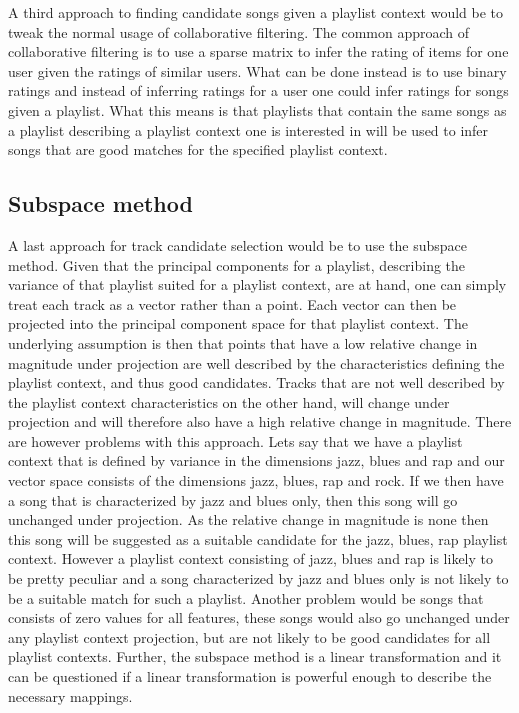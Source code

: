 \documentclass[a4paper,11pt]{kth-mag}
\begin{document}
A third approach to finding candidate songs given a playlist context would be to tweak the normal usage of collaborative filtering. The common approach of collaborative filtering is to use a sparse matrix to infer the rating of items for one user given the ratings of similar users. What can be done instead is to use binary ratings and instead of inferring ratings for a user one could infer ratings for songs given a playlist. What this means is that playlists that contain the same songs as a playlist describing a playlist context one is interested in will be used to infer songs that are good matches for the specified playlist context. 

\subsection{Subspace method}
A last approach for track candidate selection would be to use the subspace method. Given that the principal components for a playlist, describing the variance of that playlist suited for a playlist context, are at hand, one can simply treat each track as a vector rather than a point. Each vector can then be projected into the principal component space for that playlist context. The underlying assumption is then that points that have a low relative change in magnitude under projection are well described by the characteristics defining the playlist context, and thus good candidates. Tracks that are not well described by the playlist context characteristics on the other hand, will change under projection and will therefore also have a high relative change in magnitude. There are however problems with this approach. Lets say that we have a playlist context that is defined by variance in the dimensions jazz, blues and rap and our vector space consists of the dimensions jazz, blues, rap and rock. If we then have a song that is characterized by jazz and blues only, then this song will go unchanged under projection. As the relative change in magnitude is none then this song will be suggested as a suitable candidate for the jazz, blues, rap playlist context. However a playlist context consisting of jazz, blues and rap is likely to be pretty peculiar and a song characterized by jazz and blues only is not likely to be a suitable match for such a playlist. Another problem would be songs that consists of zero values for all features, these songs would also go unchanged under any playlist context projection, but are not likely to be good candidates for all playlist contexts. Further, the subspace method is a linear transformation and it can be questioned if a linear transformation is powerful enough to describe the necessary mappings.
\end{document}
